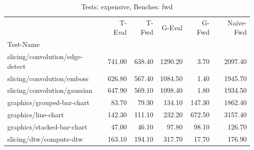 \begin{table}
\caption{Tests: expensive, Benches: fwd}
\label{expensive-fwd}
\begin{tabular}{lrrrrr}
\toprule
 & T-Eval & T-Fwd & G-Eval & G-Fwd & Naive-Fwd \\
Test-Name &  &  &  &  &  \\
\midrule
slicing/convolution/edge-detect & 741.00 & 638.40 & 1290.20 & 3.70 & 2097.40 \\
slicing/convolution/emboss & 626.80 & 567.40 & 1084.50 & 1.40 & 1945.70 \\
slicing/convolution/gaussian & 647.90 & 569.10 & 1098.40 & 1.80 & 1934.50 \\
graphics/grouped-bar-chart & 83.70 & 79.30 & 134.10 & 147.30 & 1862.40 \\
graphics/line-chart & 142.30 & 111.10 & 232.20 & 672.50 & 3157.40 \\
graphics/stacked-bar-chart & 47.00 & 46.10 & 97.80 & 98.10 & 126.70 \\
slicing/dtw/compute-dtw & 163.10 & 194.10 & 317.70 & 17.70 & 176.90 \\
\bottomrule
\end{tabular}
\end{table}
